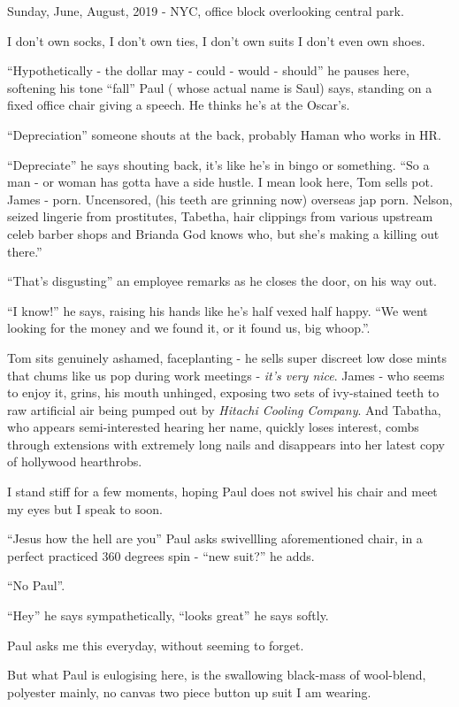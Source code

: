 \documentclass[19pt,openany]{book}
\begin{document}
Sunday, June, August, 2019 - NYC, office block overlooking central park.

I don't own socks, I don't own
ties, I don't own suits I don't
even
own shoes.

``Hypothetically - the dollar
may - could - would - should''
he pauses here, softening
his tone
``fall'' Paul (
whose actual name is Saul) says, standing
on a fixed office
chair giving a speech.
He thinks he's at the Oscar's.

``Depreciation'' someone
shouts at the back, probably
Haman who works in HR.

``Depreciate'' he says shouting
back, it's like he's in bingo or something.
``So a man - or woman has
gotta have a side hustle.
I mean look here, Tom sells pot.
James - porn. Uncensored, (his teeth
are grinning now) overseas jap porn.
Nelson, seized lingerie from prostitutes,
Tabetha, hair clippings from
various upstream celeb barber shops
and Brianda God knows who, but she's
making a killing out there.''

``That's disgusting'' an employee remarks
as he closes the door, on his way out.

``I know!'' he says,
raising his hands like he's
half vexed half happy. ``We went
looking for the money and we found it,
or it found us, big whoop.''.

Tom sits genuinely ashamed,
faceplanting - he sells
super discreet low dose mints that
chums like us pop during work meetings - \textit{it's very nice}. James - who seems to enjoy it,
grins, his mouth unhinged, exposing two sets of ivy-stained teeth
to raw artificial air being pumped out by \textit{Hitachi Cooling Company}.
And Tabatha, who appears semi-interested hearing her name, quickly loses interest,
combs through extensions with extremely long nails and disappears into her latest copy
of hollywood hearthrobs.

I stand stiff for a few
moments, hoping Paul
does not swivel his chair and
meet my eyes but I speak to soon.

``Jesus how the hell are you''
Paul asks
swivellling
aforementioned
chair, in a perfect practiced
360 degrees spin - ``new suit?'' he adds.

``No Paul''.

``Hey'' he says sympathetically,
``looks great'' he says softly.

 Paul asks me this everyday,
without seeming to forget.

But what Paul is eulogising here,
is the swallowing black-mass
of wool-blend, polyester mainly,
no canvas two piece
button up suit I am wearing.
\end{document}
